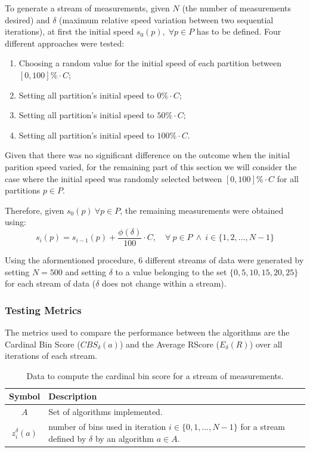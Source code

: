 To generate a stream of measurements, given $N$ (the number of measurements
desired) and $\delta$ (maximum relative speed variation between two sequential
iterations), at first the initial speed $s_0(p), \; \forall p \in P$ has to be
defined. Four different approaches were tested:
\begin{enumerate}
    \item Choosing a random value for the initial speed of each partition
        between $[0, 100]\% \cdot C$;
    \item Setting all partition's initial speed to $0\% \cdot C$;
    \item Setting all partition's initial speed to $50\% \cdot C$;
    \item Setting all partition's initial speed to $100\% \cdot C$.
\end{enumerate}

Given that there was no significant difference on the outcome when the initial
parition speed varied, for the remaining part of this section we will consider
the case where the initial speed was randomly selected between $[0, 100]\% \cdot
C$ for all partitions $p \in P$.

Therefore, given $s_0(p)\ \forall p \in P$, the remaining measurements were
obtained using: 
\begin{equation}
    s_i(p) = s_{i-1}(p) + \frac{\phi(\delta)}{100} \cdot C, \quad 
        \forall \ p \in P \ \wedge \ 
        i \in \{1, 2, ..., N-1\}
\end{equation}

Using the aformentioned procedure, 6 different streams of data were generated by
setting $N = 500$ and setting $\delta$ to a value belonging to the set
$\{0, 5, 10, 15, 20, 25\}$ for each stream of data ($\delta$ does not change
within a stream).

\subsubsection{Testing Metrics}

The metrics used to compare the performance between the algorithms are the
Cardinal Bin Score ($CBS_\delta(a)$) and the Average RScore ($E_\delta(R)$) over all iterations
of each stream.

\begin{table}[H] 
\centering 
\caption{Data to compute the cardinal bin score for a stream of measurements.} 
\label{table:bin_score} 
    \begin{tabular}{ |c|p{}| } 
    \hline 
    \textbf{Symbol} & \textbf{Description} \\ 
    \hline 
    $A$ & Set of algorithms implemented. \\ 
    $z_i^\delta(a)$ & number of bins used in iteration $i \in \{0, 1, ..., N-1\}$ for a
        stream defined by $\delta$ by an algorithm $a \in A$. \\ 
    \hline 
\end{tabular} 
\end{table}

